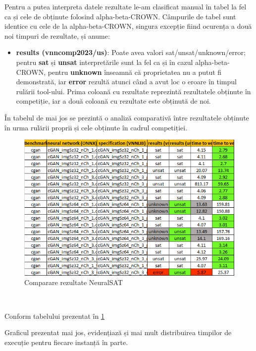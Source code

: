 Pentru a putea interpreta datele rezultate le-am clasificat manual în tabel la fel ca și cele de obținute folosind alpha-beta-CROWN. Câmpurile de tabel sunt identice cu cele de la alpha-beta-CROWN, singura excepție fiind ocurența a două noi timpuri de rezultate, și anume:
\begin{itemize}
    \item \textbf{results (vnncomp2023/us)}: Poate avea valori sat/unsat/unknown/error; pentru \textbf{sat} și \textbf{unsat} interpretările sunt la fel ca și în cazul alpha-beta-CROWN, pentru \textbf{unknown} înseamnă că proprietatea nu a putut fi demonstrată, iar \textbf{error} rezultă atunci când a avut loc o eroare în timpul rulării tool-ului.
    Prima coloană cu rezultate reprezintă rezultatele obținute în competiție, iar a două coloană cu rezultate este obținută de noi.
\end{itemize}

În tabelul de mai jos se prezintă o analiză comparativă între rezultatele obținute în urma rulării proprii și cele obținute în cadrul competiției.

\begin{figure}[h]
\centering 
\includegraphics[width=0.8\linewidth]{imagini/interpretare rezultate/NeuralSAT_comp_vs_us.png}
\caption{Comparare rezultate NeuralSAT}
\label{fig:image2} 
\end{figure}
\

Conform tabelului prezentat în \ref{fig:image2}

Graficul prezentat mai jos, evidențiază și mai mult distribuirea timpilor de execuție pentru fiecare instanță în parte.